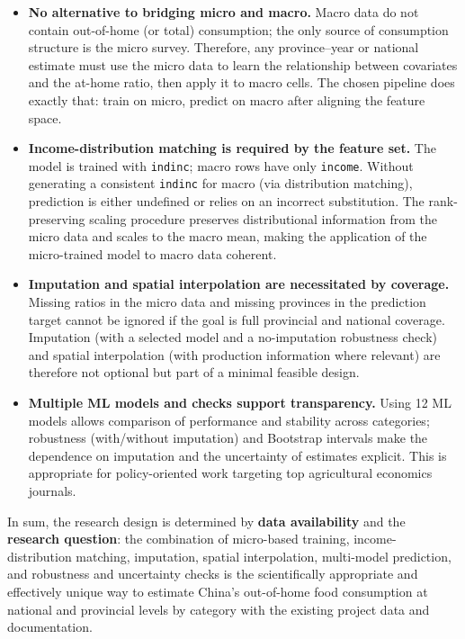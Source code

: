\begin{itemize}
  \item \textbf{No alternative to bridging micro and macro.} Macro data do not contain out-of-home (or total) consumption; the only source of consumption structure is the micro survey. Therefore, any province--year or national estimate must use the micro data to learn the relationship between covariates and the at-home ratio, then apply it to macro cells. The chosen pipeline does exactly that: train on micro, predict on macro after aligning the feature space.

  \item \textbf{Income-distribution matching is required by the feature set.} The model is trained with \texttt{indinc}; macro rows have only \texttt{income}. Without generating a consistent \texttt{indinc} for macro (via distribution matching), prediction is either undefined or relies on an incorrect substitution. The rank-preserving scaling procedure preserves distributional information from the micro data and scales to the macro mean, making the application of the micro-trained model to macro data coherent.

  \item \textbf{Imputation and spatial interpolation are necessitated by coverage.} Missing ratios in the micro data and missing provinces in the prediction target cannot be ignored if the goal is full provincial and national coverage. Imputation (with a selected model and a no-imputation robustness check) and spatial interpolation (with production information where relevant) are therefore not optional but part of a minimal feasible design.

  \item \textbf{Multiple ML models and checks support transparency.} Using 12 ML models allows comparison of performance and stability across categories; robustness (with/without imputation) and Bootstrap intervals make the dependence on imputation and the uncertainty of estimates explicit. This is appropriate for policy-oriented work targeting top agricultural economics journals.

\end{itemize}

In sum, the research design is determined by \textbf{data availability} and the \textbf{research question}: the combination of micro-based training, income-distribution matching, imputation, spatial interpolation, multi-model prediction, and robustness and uncertainty checks is the scientifically appropriate and effectively unique way to estimate China's out-of-home food consumption at national and provincial levels by category with the existing project data and documentation.
